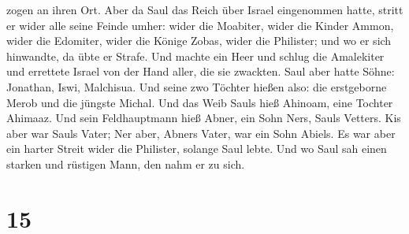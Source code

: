 zogen an ihren Ort.  Aber da Saul das Reich über Israel
eingenommen hatte, stritt er wider alle seine Feinde umher: wider die
Moabiter, wider die Kinder Ammon, wider die Edomiter, wider die Könige
Zobas, wider die Philister; und wo er sich hinwandte, da übte er Strafe.
 Und machte ein Heer und schlug die Amalekiter und
errettete Israel von der Hand aller, die sie zwackten. 
Saul aber hatte Söhne: Jonathan, Iswi, Malchisua. Und seine zwo Töchter
hießen also: die erstgeborne Merob und die jüngste Michal. 
Und das Weib Sauls hieß Ahinoam, eine Tochter Ahimaaz. Und sein
Feldhauptmann hieß Abner, ein Sohn Ners, Sauls Vetters. 
Kis aber war Sauls Vater; Ner aber, Abners Vater, war ein Sohn Abiels.
 Es war aber ein harter Streit wider die Philister, solange
Saul lebte. Und wo Saul sah einen starken und rüstigen Mann, den nahm er
zu sich.

\hypertarget{section-14}{%
\section{15}\label{section-14}}


